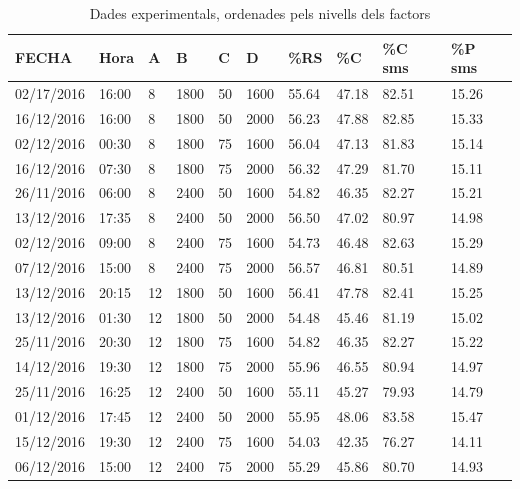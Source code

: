 \documentclass[a4paper]{article}
\begin{document}
\begin{table}[H]
	\centering
	\begin{tabular}{ l | l | l | l | l | l | l | l | l | l }
		\rowcolor{gray!50}
		FECHA & Hora & A & B & C & D & \%RS & \%C & \%C sms & \%P sms \\ \hline
		02/17/2016 & 16:00 & 8 & 1800 & 50 & 1600 & 55.64 & 47.18 & 82.51 & 15.26 \\ 
		16/12/2016 & 16:00 & 8 & 1800 & 50 & 2000 & 56.23 & 47.88 & 82.85 & 15.33 \\ 
		02/12/2016 & 00:30 & 8 & 1800 & 75 & 1600 & 56.04 & 47.13 & 81.83 & 15.14 \\ 
		16/12/2016 & 07:30 & 8 & 1800 & 75 & 2000 & 56.32 & 47.29 & 81.70 & 15.11 \\ 
		26/11/2016 & 06:00 & 8 & 2400 & 50 & 1600 & 54.82 & 46.35 & 82.27 & 15.21 \\ 
		13/12/2016 & 17:35 & 8 & 2400 & 50 & 2000 & 56.50 & 47.02 & 80.97 & 14.98 \\ 
		02/12/2016 & 09:00 & 8 & 2400 & 75 & 1600 & 54.73 & 46.48 & 82.63 & 15.29 \\ 
		07/12/2016 & 15:00 & 8 & 2400 & 75 & 2000 & 56.57 & 46.81 & 80.51 & 14.89 \\ 
		13/12/2016 & 20:15 & 12 & 1800 & 50 & 1600 & 56.41 & 47.78 & 82.41 & 15.25 \\ 
		13/12/2016 & 01:30 & 12 & 1800 & 50 & 2000 & 54.48 & 45.46 & 81.19 & 15.02 \\ 
		25/11/2016 & 20:30 & 12 & 1800 & 75 & 1600 & 54.82 & 46.35 & 82.27 & 15.22 \\ 
		14/12/2016 & 19:30 & 12 & 1800 & 75 & 2000 & 55.96 & 46.55 & 80.94 & 14.97 \\ 
		25/11/2016 & 16:25 & 12 & 2400 & 50 & 1600 & 55.11 & 45.27 & 79.93 & 14.79 \\ 
		01/12/2016 & 17:45 & 12 & 2400 & 50 & 2000 & 55.95 & 48.06 & 83.58 & 15.47 \\ 
		15/12/2016 & 19:30 & 12 & 2400 & 75 & 1600 & 54.03 & 42.35 & 76.27 & 14.11 \\ 
		06/12/2016 & 15:00 & 12 & 2400 & 75 & 2000 & 55.29 & 45.86 & 80.70 & 14.93 \\ 
	\end{tabular}
	\caption{Dades experimentals, ordenades pels nivells dels factors}
	\label{tab:resultats}
\end{table}
\end{document}
